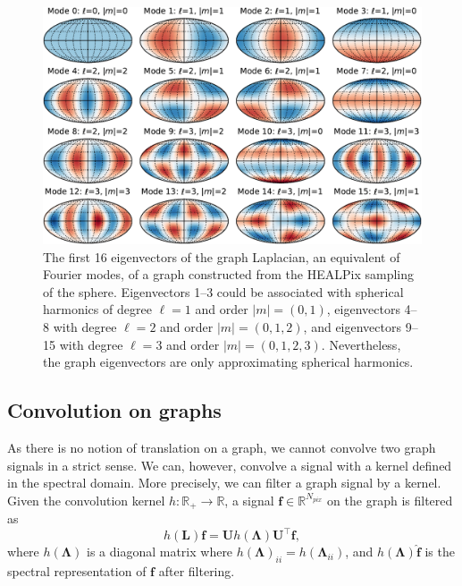 \documentclass[final,twocolumn,3p,times,sort&compress]{elsarticle}
\renewcommand{\b}[1]{{\bm{#1}}}   %
\newcommand{\1}{\b{1}}              %
\newcommand{\0}{\b{0}}              %
\renewcommand{\L}{\b{L}}
\newcommand{\U}{\b{U}}
\newcommand{\f}{\b{f}}
\newcommand{\trans}{^\intercal}
\newcommand{\R}{\mathbb{R}}
\newcommand{\bLambda}{\b{\Lambda}}
\begin{document}
\begin{figure}
	\centering
	\includegraphics[width=\linewidth]{eigenvectors}
	\caption{The first 16 eigenvectors of the graph Laplacian, an equivalent of Fourier modes, of a graph constructed from the HEALPix sampling of the sphere.
    Eigenvectors 1--3 could be associated with spherical harmonics of degree $\ell=1$ and order $|m|=(0,1)$, eigenvectors 4--8 with degree $\ell=2$ and order $|m|=(0,1,2)$, and eigenvectors 9--15 with degree $\ell=3$ and order $|m|=(0,1,2,3)$.
    Nevertheless, the graph eigenvectors are only approximating spherical harmonics.}
	\label{fig:graph_harmonics}
\end{figure}

\subsection{Convolution on graphs}
\label{sec:graph_convolution}


As there is no notion of translation on a graph, we cannot convolve two graph signals in a strict sense.
We can, however, convolve a signal with a kernel defined in the spectral domain.
More precisely, we can filter a graph signal by a kernel.
Given the convolution kernel
$h: \R_+ \rightarrow \R$, a signal $\f \in \R^{N_{pix}}$ on the graph is filtered as
\begin{equation} \label{eqn:graph_convolution_fourier}
	h(\L) \f = \U h(\bLambda) \U\trans \f,
\end{equation}
where $h(\bLambda)$ is a diagonal matrix where $h(\bLambda)_{ii} = h(\bLambda_{ii})$, and $h(\bLambda) \hat{\f}$ is the spectral representation of $\f$ after filtering.
\end{document}
